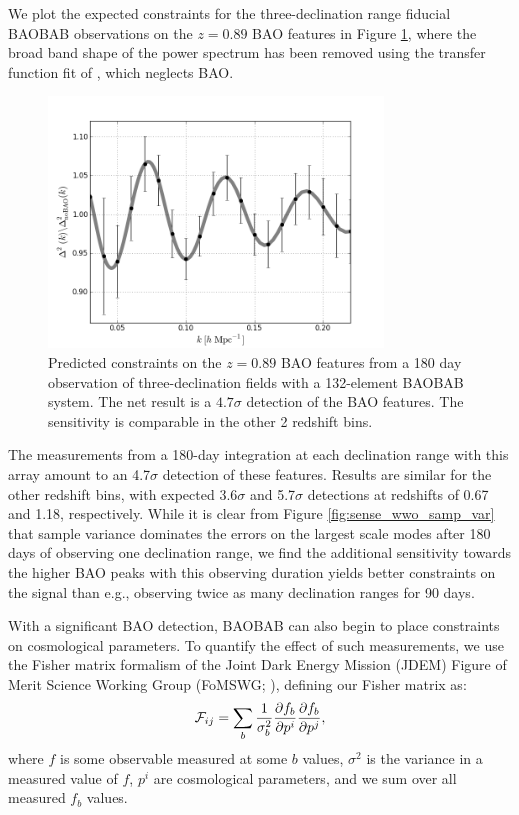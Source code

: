\documentclass[10pt,iop]{emulateapj}
\begin{document}
We plot the expected constraints for the three-declination range fiducial 
BAOBAB observations on
the $z = 0.89$ BAO features in Figure \ref{fig:baobab128_sense}, where the 
broad band
shape of the power spectrum has been removed using the transfer function fit
of \citet{eisenstein_and_hu_1998}, which neglects BAO.  
\begin{figure}\centering
\includegraphics[width=3.5in]{baobab128_sense-2.png}
\caption{Predicted constraints on the $z = 0.89$ BAO features from a 180 day observation
of three-declination fields with
a 132-element BAOBAB system.  The net result is a $4.7\sigma$ detection of the BAO features.  The sensitivity is comparable in the other 2 redshift bins.
} \label{fig:baobab128_sense}
\end{figure}
The measurements from a 180-day integration at each declination range with this array 
amount to an 4.7$\sigma$ detection of these features.  Results are similar
for the other redshift bins, with expected 3.6$\sigma$ and 5.7$\sigma$ detections at redshifts of 
0.67 and 1.18, respectively.  While it is clear from Figure \ref{fig:sense_wwo_samp_var} that
sample variance dominates the errors on the largest scale modes after 180 days of observing
one declination range, we find the additional sensitivity towards the higher BAO peaks with this
observing duration yields better constraints on the signal than e.g., observing twice as many
declination ranges for 90 days.  

With a significant BAO detection, BAOBAB can also begin to place 
constraints on cosmological parameters.  To quantify the effect of such measurements,
we use the Fisher matrix formalism of the Joint Dark Energy Mission (JDEM) Figure of Merit
Science Working Group (FoMSWG; \citealt{albrecht_et_al_2009}), defining our Fisher matrix as:
\begin{equation}
\label{eq:fish}
{\cal F}_{ij} = \sum_b \frac{1}{\sigma_b^2}\frac{\partial f_b}{\partial p^i}\frac{\partial f_b}{\partial p^j},
\end{equation}
where $f$ is some observable measured at some $b$ values, $\sigma^2$ is the variance in a 
measured value of $f$, $p^i$ are cosmological parameters, and
we sum over all measured $f_b$ values.  
\end{document}
